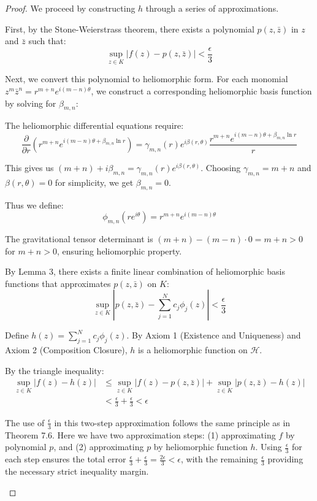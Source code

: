 \begin{proof}
We proceed by constructing $h$ through a series of approximations.

First, by the Stone-Weierstrass theorem, there exists a polynomial $p(z, \bar{z})$ in $z$ and $\bar{z}$ such that:
\begin{equation}
\sup_{z \in K} |f(z) - p(z, \bar{z})| < \frac{\epsilon}{3}
\end{equation}

Next, we convert this polynomial to heliomorphic form. For each monomial $z^m\bar{z}^n = r^{m+n}e^{i(m-n)\theta}$, we construct a corresponding heliomorphic basis function by solving for $\beta_{m,n}$:

The heliomorphic differential equations require:
$$\frac{\partial}{\partial r}\left(r^{m+n}e^{i(m-n)\theta + \beta_{m,n}\ln r}\right) = \gamma_{m,n}(r)e^{i\beta(r,\theta)}\frac{r^{m+n}e^{i(m-n)\theta + \beta_{m,n}\ln r}}{r}$$

This gives us $(m+n) + i\beta_{m,n} = \gamma_{m,n}(r)e^{i\beta(r,\theta)}$. Choosing $\gamma_{m,n} = m+n$ and $\beta(r,\theta) = 0$ for simplicity, we get $\beta_{m,n} = 0$.

Thus we define:
\begin{equation}
\phi_{m,n}(re^{i\theta}) = r^{m+n}e^{i(m-n)\theta}
\end{equation}

The gravitational tensor determinant is $(m+n) - (m-n) \cdot 0 = m+n > 0$ for $m+n > 0$, ensuring heliomorphic property.

By Lemma 3, there exists a finite linear combination of heliomorphic basis functions that approximates $p(z, \bar{z})$ on $K$:
\begin{equation}
\sup_{z \in K} |p(z, \bar{z}) - \sum_{j=1}^{N} c_j\phi_j(z)| < \frac{\epsilon}{3}
\end{equation}

Define $h(z) = \sum_{j=1}^{N} c_j\phi_j(z)$. By Axiom 1 (Existence and Uniqueness) and Axiom 2 (Composition Closure), $h$ is a heliomorphic function on $\mathcal{H}$.

By the triangle inequality:
\begin{align}
\sup_{z \in K} |f(z) - h(z)| &\leq \sup_{z \in K} |f(z) - p(z, \bar{z})| + \sup_{z \in K} |p(z, \bar{z}) - h(z)|\\
&< \frac{\epsilon}{3} + \frac{\epsilon}{3} < \epsilon
\end{align}

\begin{remark}
The use of $\frac{\epsilon}{3}$ in this two-step approximation follows the same principle as in Theorem 7.6. Here we have two approximation steps: (1) approximating $f$ by polynomial $p$, and (2) approximating $p$ by heliomorphic function $h$. Using $\frac{\epsilon}{3}$ for each step ensures the total error $\frac{\epsilon}{3} + \frac{\epsilon}{3} = \frac{2\epsilon}{3} < \epsilon$, with the remaining $\frac{\epsilon}{3}$ providing the necessary strict inequality margin.
\end{remark}


\end{proof}
